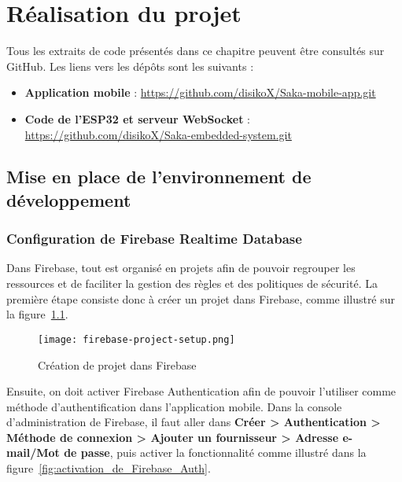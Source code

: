 \pagestyle{fancy}
\fancyhead{} %

\chapter{Réalisation du projet}
Tous les extraits de code présentés dans ce chapitre peuvent être consultés sur GitHub. Les liens vers les dépôts sont les suivants :

\begin{itemize}
  \item \textbf{Application mobile} : \href{https://github.com/disikoX/Saka-mobile-app.git}{https://github.com/disikoX/Saka-mobile-app.git}
  \item \textbf{Code de l'ESP32 et serveur WebSocket} : \href{https://github.com/disikoX/Saka-embedded-system.git}{https://github.com/disikoX/Saka-embedded-system.git}
\end{itemize}

\section{Mise en place de l'environnement de développement}
\subsection{Configuration de Firebase Realtime Database}
Dans Firebase, tout est organisé en projets afin de pouvoir regrouper les ressources et de faciliter la gestion des règles et des politiques de sécurité. La première étape consiste donc à créer un projet dans Firebase, comme illustré sur la figure~\ref{fig:creation_projet_dans_firebase}.

\begin{figure}[H]
   \centering
   \texttt{[image: firebase-project-setup.png]}
   \caption{Création de projet dans Firebase}
   \label{fig:creation_projet_dans_firebase}
\end{figure}

Ensuite, on doit activer Firebase Authentication afin de pouvoir l'utiliser comme méthode d'authentification dans l'application mobile. Dans la console d'administration de Firebase, il faut aller dans \textbf{Créer > Authentication > Méthode de connexion > Ajouter un fournisseur > Adresse e-mail/Mot de passe}, puis activer la fonctionnalité comme illustré dans la figure~\ref{fig:activation_de_Firebase_Auth}.

